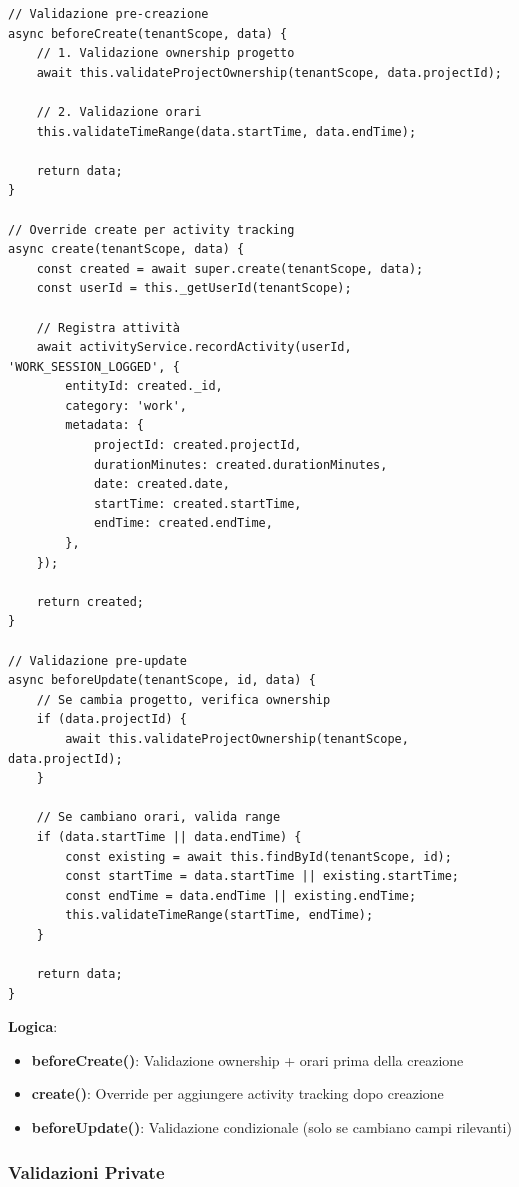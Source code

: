 \documentclass[11pt,a4paper]{article}
\begin{document}
\begin{lstlisting}
// Validazione pre-creazione
async beforeCreate(tenantScope, data) {
    // 1. Validazione ownership progetto
    await this.validateProjectOwnership(tenantScope, data.projectId);
    
    // 2. Validazione orari
    this.validateTimeRange(data.startTime, data.endTime);
    
    return data;
}

// Override create per activity tracking
async create(tenantScope, data) {
    const created = await super.create(tenantScope, data);
    const userId = this._getUserId(tenantScope);
    
    // Registra attività
    await activityService.recordActivity(userId, 'WORK_SESSION_LOGGED', {
        entityId: created._id,
        category: 'work',
        metadata: {
            projectId: created.projectId,
            durationMinutes: created.durationMinutes,
            date: created.date,
            startTime: created.startTime,
            endTime: created.endTime,
        },
    });
    
    return created;
}

// Validazione pre-update
async beforeUpdate(tenantScope, id, data) {
    // Se cambia progetto, verifica ownership
    if (data.projectId) {
        await this.validateProjectOwnership(tenantScope, data.projectId);
    }
    
    // Se cambiano orari, valida range
    if (data.startTime || data.endTime) {
        const existing = await this.findById(tenantScope, id);
        const startTime = data.startTime || existing.startTime;
        const endTime = data.endTime || existing.endTime;
        this.validateTimeRange(startTime, endTime);
    }
    
    return data;
}
\end{lstlisting}

\textbf{Logica}:
\begin{itemize}
    \item \textbf{beforeCreate()}: Validazione ownership + orari prima della creazione
    \item \textbf{create()}: Override per aggiungere activity tracking dopo creazione
    \item \textbf{beforeUpdate()}: Validazione condizionale (solo se cambiano campi rilevanti)
\end{itemize}

\subsubsection{Validazioni Private}
\end{document}
